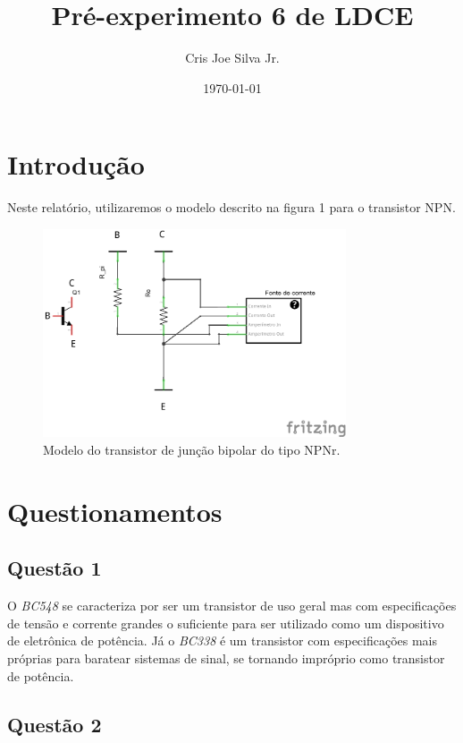 \documentclass[12pt, a4paper, twoside]{article}
\title{Pré-experimento 6 de LDCE}
\author{Cris Joe Silva Jr.}
\date{\today}
\begin{document}
\maketitle

\section{Introdução}

Neste relatório, utilizaremos o modelo descrito na figura 1 para o transistor NPN.

\begin{figure}[H]
    \centering
    \includegraphics[width=0.8\textwidth]{figs/bjt.png}
    \caption{Modelo do transistor de junção bipolar do tipo NPNr.}
\end{figure}


\section{Questionamentos}

\subsection{Questão 1}

O \textit{BC548} se caracteriza por ser um transistor de uso geral mas com especificações de tensão e corrente grandes o suficiente para ser utilizado como um dispositivo de eletrônica de potência. Já o \textit{BC338} é um transistor com especificações mais próprias para baratear sistemas de sinal, se tornando impróprio como transistor de potência.

\subsection{Questão 2}
\end{document}
